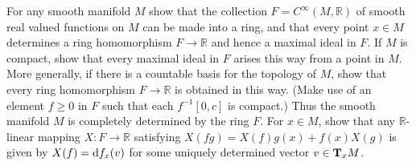 \documentclass[../main]{subfiles}
\begin{document}
\begin{problem}
\label{prob:1-C}
For any smooth manifold $M$ show that the collection $F = C^\infty(M, \mathbb R)$ of smooth real valued functions on $M$ can be made into a ring, and that every point $x \in M$ determines a ring homomorphism $F \longrightarrow \mathbb R$ and hence a maximal ideal in $F$. If $M$ is compact, show that every maximal ideal in $F$ arises this way from a point in $M$. More generally, if there is a countable basis for the topology of $M$, show that every ring homomorphism $F \longrightarrow \mathbb R$ is obtained in this way. (Make use of an element $f \ge 0$ in $F$ such that each $f^{-1}[0, c]$ is compact.) Thus the smooth manifold $M$ is completely determined by the ring $F$. For $x \in M$, show that any $\mathbb R$-linear mapping $X : F \longrightarrow \mathbb R$ satisfying $X(fg) = X(f)g(x) + f(x) X(g)$ is given by $X(f) = \differential f x(v)$ for some uniquely determined vector $v \in \tangentspace M x$. 
\end{problem}
\end{document}
